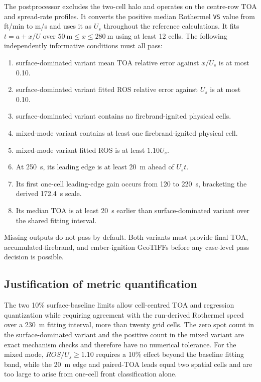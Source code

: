 The postprocessor excludes the two-cell halo and operates on the centre-row
TOA and spread-rate profiles. It converts the positive median Rothermel
\texttt{VS} value from ft/min to m/s and uses it as $U_s$ throughout the
reference calculations. It fits $t=a+x/U$ over
$\SI{50}{\metre}\le x\le\SI{280}{\metre}$ using at least 12 cells.
The following independently informative conditions must all pass:

\begin{enumerate}
\item surface-dominated variant mean TOA relative error against $x/U_s$ is at most 0.10.
\item surface-dominated variant fitted ROS relative error against $U_s$ is at most 0.10.
\item surface-dominated variant contains no firebrand-ignited physical cells.
\item mixed-mode variant contains at least one firebrand-ignited physical cell.
\item mixed-mode variant fitted ROS is at least $1.10U_s$.
\item At \SI{250}{\second}, its leading edge is at least \SI{20}{\metre}
      ahead of $U_s t$.
\item Its first one-cell leading-edge gain occurs from 120 to
      \SI{220}{\second}, bracketing the derived \SI{172.4}{\second} scale.
\item Its median TOA is at least \SI{20}{\second} earlier than surface-dominated variant over
      the shared fitting interval.
\end{enumerate}

Missing outputs do not pass by default. Both variants must provide final TOA,
accumulated-firebrand, and ember-ignition GeoTIFFs before any case-level pass
decision is possible.

\subsection{Justification of metric quantification}

The two 10\% surface-baseline limits allow cell-centred TOA and regression
quantization while requiring agreement with the run-derived Rothermel speed
over a \SI{230}{m} fitting interval, more than twenty grid cells.  The zero
spot count in the surface-dominated variant and the positive count in the
mixed variant are exact mechanism checks and therefore have no numerical
tolerance.  For the mixed mode, \(ROS/U_s\ge1.10\) requires a 10\% effect
beyond the baseline fitting band, while the \SI{20}{m} edge and paired-TOA
leads equal two spatial cells and are too large to arise from one-cell front
classification alone.


